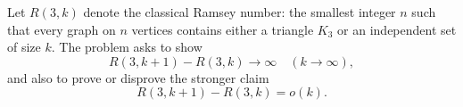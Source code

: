 Let $R(3,k)$ denote the classical Ramsey number: the smallest integer $n$ such that every graph on $n$ vertices contains either a triangle $K_3$ or an independent set of size $k$.
The problem asks to show
\[
R(3,k+1)-R(3,k)\to\infty\quad (k\to\infty),
\]
and also to prove or disprove the stronger claim
\[
R(3,k+1)-R(3,k)=o(k).
\]
